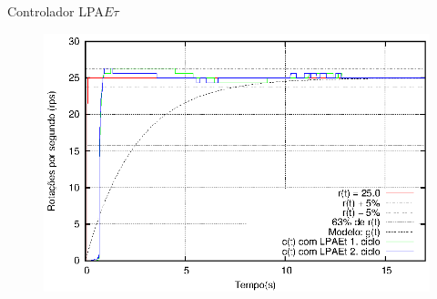 \begin{frame}{Controlador LPA$E\tau$}

\vspace{-0.5cm}
\begin{figure}[!htb]
\center\includegraphics[scale=1.0]{./imagens/LPAEt-erro.eps}
\label{fig:lpaetErro}

\end{figure}


\end{frame}
